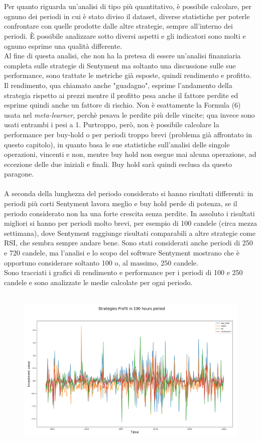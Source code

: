 \documentclass[a4paper,12pt]{report}
\begin{document}
\begin{fig}
\\~\\Per quanto riguarda un'analisi di tipo più quantitativo, è possibile calcolare, per ognuno dei periodi in cui è stato diviso il dataset, diverse statistiche per poterle confrontare con quelle prodotte dalle altre strategie, sempre all'interno dei periodi. È possibile analizzare sotto diversi aspetti e gli indicatori sono molti e ognuno esprime una qualità differente.\\ Al fine di questa analisi, che non ha la pretesa di essere un'analisi finanziaria completa sulle strategie di Sentyment ma soltanto una discussione sulle sue performance, sono trattate le metriche già esposte, quindi rendimento e profitto. Il rendimento, qua chiamato anche "guadagno", esprime l'andamento della strategia rispetto ai prezzi mentre il profitto pesa anche il fattore perdite ed esprime quindi anche un fattore di rischio. Non è esattamente la Formula (6) usata nel \textit{meta-learner}, perchè pesava le perdite più delle vincite; qua invece sono usati entrambi i pesi a 1. Purtroppo, però, non è possibile calcolare la performance per buy-hold o per periodi troppo brevi (problema già affrontato in questo capitolo), in quanto basa le sue statistiche sull'analisi delle singole operazioni, vincenti e non, mentre buy hold non esegue mai alcuna operazione, ad eccezione delle due iniziali e finali. Buy hold sarà quindi esclusa da questo paragone.\\~\\
A seconda della lunghezza del periodo considerato si hanno risultati differenti: in periodi più corti Sentyment lavora meglio e buy hold perde di potenza, se il periodo considerato non ha una forte crescita senza perdite. In assoluto i risultati migliori si hanno per periodi molto brevi, per esempio di 100 candele (circa mezza settimana), dove Sentyment raggiunge risultati comparabili a altre strategie come RSI, che sembra sempre andare bene. Sono stati considerati anche periodi di 250 e 720 candele, ma l'analisi e lo scopo del software Sentyment mostrano che è opportuno considerare soltanto 100 o, al massimo, 250 candele.\\ Sono tracciati i grafici di rendimento e performance per i periodi di 100 e 250 candele e sono analizzate le medie calcolate per ogni periodo.\\~\\
\begin{fig}
	\begin{subfigure}{\linewidth}
		\includegraphics[width=.5\linewidth]{final_gain_100}

\end{subfigure}
\end{fig}
\end{fig}
\end{document}
